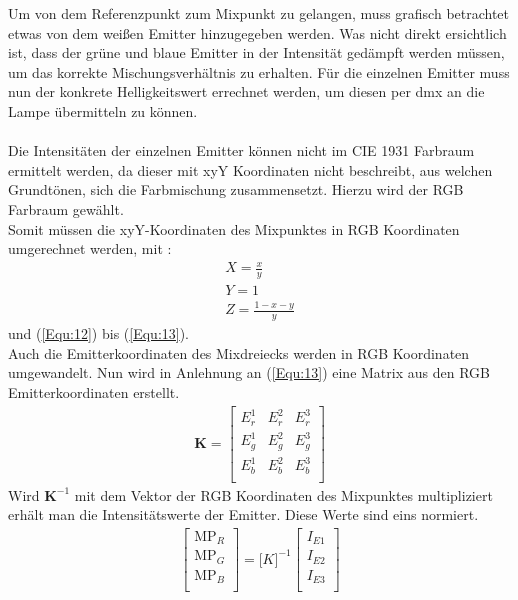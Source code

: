 \documentclass[11pt]{scrartcl}
\begin{document}
Um von dem Referenzpunkt zum Mixpunkt zu gelangen, muss grafisch betrachtet etwas von dem weißen Emitter hinzugegeben werden. Was nicht direkt ersichtlich
ist, dass der grüne und blaue Emitter in der Intensität gedämpft werden müssen, um das korrekte Mischungsverhältnis zu erhalten. Für die einzelnen Emitter muss
nun der konkrete Helligkeitswert errechnet werden, um diesen per \ac{dmx} an die Lampe übermitteln zu können.\\
\\
Die Intensitäten der einzelnen Emitter können nicht im CIE 1931 Farbraum ermittelt werden, da dieser mit xyY Koordinaten nicht beschreibt, aus welchen Grundtönen,
sich die Farbmischung zusammensetzt. Hierzu wird der RGB Farbraum gewählt.\\
Somit müssen die xyY-Koordinaten des Mixpunktes in RGB Koordinaten umgerechnet werden, mit \cite{lindbloom}:
\begin{align}\label{Equ:19}
    X = \frac{x}{y}\\
    Y = 1\\
    Z = \frac{1-x-y}{y}
\end{align}
und (\ref{Equ:12}) bis (\ref{Equ:13}).\\
Auch die Emitterkoordinaten des Mixdreiecks werden in RGB Koordinaten umgewandelt. Nun wird in Anlehnung an (\ref{Equ:13}) eine Matrix aus den RGB
Emitterkoordinaten erstellt.
\begin{align}\label{Equ:20}
    \mathbf K = \left[ \begin{array}{rrr}
        E^1_r  & E^2_r & E^3_r \\
        E^1_g  & E^2_g & E^3_g \\
        E^1_b  & E^2_b & E^3_b \\
    \end{array}\right]
\end{align}
Wird $\mathbf K^{-1}$ mit dem Vektor der RGB Koordinaten des Mixpunktes multipliziert erhält man die Intensitätswerte der Emitter. Diese Werte sind eins normiert.
\begin{align}\label{Equ:21}
    \left[ \begin{array}{r}
        \text{MP}_R \\
        \text{MP}_G \\
        \text{MP}_B \\
    \end{array}\right]
    = {\mathbf [K]^{-1}} \left[ \begin{array}{r}
        I_{E1} \\
        I_{E2} \\
        I_{E3} \\
    \end{array}\right]
\end{align}
\end{document}
